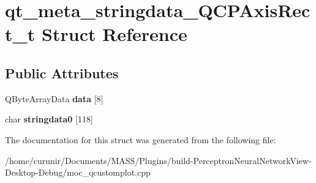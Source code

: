 \hypertarget{structqt__meta__stringdata___q_c_p_axis_rect__t}{}\section{qt\+\_\+meta\+\_\+stringdata\+\_\+\+Q\+C\+P\+Axis\+Rect\+\_\+t Struct Reference}
\label{structqt__meta__stringdata___q_c_p_axis_rect__t}
\subsection*{Public Attributes}
\begin{DoxyCompactItemize}
\item 
Q\+Byte\+Array\+Data {\bfseries data} \mbox{[}8\mbox{]}\hypertarget{structqt__meta__stringdata___q_c_p_axis_rect__t_abe371091541ce1b738a7026d4387d5b2}{}\label{structqt__meta__stringdata___q_c_p_axis_rect__t_abe371091541ce1b738a7026d4387d5b2}

\item 
char {\bfseries stringdata0} \mbox{[}118\mbox{]}\hypertarget{structqt__meta__stringdata___q_c_p_axis_rect__t_a7263fed0445758459e2610e1b9fffe05}{}\label{structqt__meta__stringdata___q_c_p_axis_rect__t_a7263fed0445758459e2610e1b9fffe05}

\end{DoxyCompactItemize}


The documentation for this struct was generated from the following file\+:\begin{DoxyCompactItemize}
\item 
/home/curunir/\+Documents/\+M\+A\+S\+S/\+Plugins/build-\/\+Perceptron\+Neural\+Network\+View-\/\+Desktop-\/\+Debug/moc\+\_\+qcustomplot.\+cpp\end{DoxyCompactItemize}
